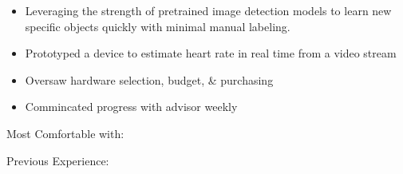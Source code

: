 \documentclass[10pt,letterpaper,ragged2e]{altacv}
\begin{document}

\begin{itemize}
\item Leveraging the strength of pretrained image detection models to learn new specific objects quickly with minimal manual labeling.  
\end{itemize}

\divider

\begin{itemize}
  \item Prototyped a device to estimate heart rate in real time from a video stream
  \item Oversaw hardware selection, budget, \& purchasing
  \item Commincated progress with advisor weekly
\end{itemize}


Most Comfortable with: 
\cvtag{\faGit}

Previous Experience:
\end{document}
